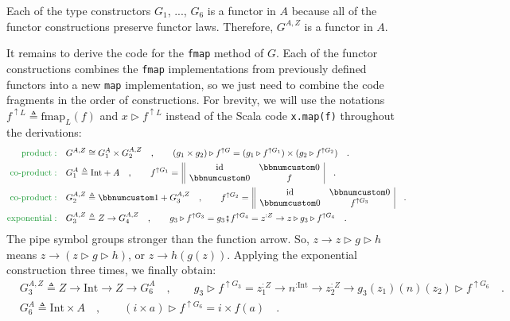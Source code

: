 Each of the type constructors $G_{1}$, ..., $G_{6}$ is a functor
in $A$ because all of the functor constructions preserve functor
laws. Therefore, $G^{A,Z}$ is a functor in $A$. 

It remains to derive the code for the \lstinline!fmap! method of
$G$. Each of the functor constructions combines the \lstinline!fmap!
implementations from previously defined functors into a new \lstinline!map!
implementation, so we just need to combine the code fragments in the
order of constructions. For brevity, we will use the notations $f^{\uparrow L}\triangleq\text{fmap}_{L}(f)$
and $x\triangleright f^{\uparrow L}$ instead of the Scala code \lstinline!x.map(f)!
throughout the derivations:
\begin{align*}
{\color{greenunder}\text{product}:}\quad & G^{A,Z}\cong G_{1}^{A}\times G_{2}^{A,Z}\quad,\quad\quad(g_{1}\times g_{2})\triangleright f^{\uparrow G}=(g_{1}\triangleright f^{\uparrow G_{1}})\times(g_{2}\triangleright f^{\uparrow G_{2}})\quad.\\
{\color{greenunder}\text{co-product}:}\quad & G_{1}^{A}\triangleq\text{Int}+A\quad,\quad\quad f^{\uparrow G_{1}}=\,\begin{array}{||cc|}
\text{id} & \bbnum 0\\
\bbnum 0 & f
\end{array}\quad.\\
{\color{greenunder}\text{co-product}:}\quad & G_{2}^{A,Z}\triangleq\bbnum 1+G_{3}^{A,Z}\quad,\quad\quad f^{\uparrow G_{2}}=\,\begin{array}{||cc|}
\text{id} & \bbnum 0\\
\bbnum 0 & f^{\uparrow G_{3}}
\end{array}\quad.\\
{\color{greenunder}\text{exponential}:}\quad & G_{3}^{A,Z}\triangleq Z\rightarrow G_{4}^{A,Z}\quad,\quad\quad g_{3}\triangleright f^{\uparrow G_{3}}=g_{3}\bef f^{\uparrow G_{4}}=z^{:Z}\rightarrow z\triangleright g_{3}\triangleright f^{\uparrow G_{4}}\quad.
\end{align*}
The pipe symbol groups stronger than the function arrow.
So, $z\rightarrow z\triangleright g\triangleright h$ means $z\rightarrow(z\triangleright g\triangleright h)$,
or $z\rightarrow h(g(z))$. Applying the exponential  construction
three times, we finally obtain:
\begin{align*}
 & G_{3}^{A,Z}\triangleq Z\rightarrow\text{Int}\rightarrow Z\rightarrow G_{6}^{A}\quad,\quad\quad g_{3}\triangleright f^{\uparrow G_{3}}=z_{1}^{:Z}\rightarrow n^{:\text{Int}}\rightarrow z_{2}^{:Z}\rightarrow g_{3}(z_{1})(n)(z_{2})\triangleright f^{\uparrow G_{6}}\quad.\\
 & G_{6}^{A}\triangleq\text{Int}\times A\quad,\quad\quad(i\times a)\triangleright f^{\uparrow G_{6}}=i\times f(a)\quad.
\end{align*}

